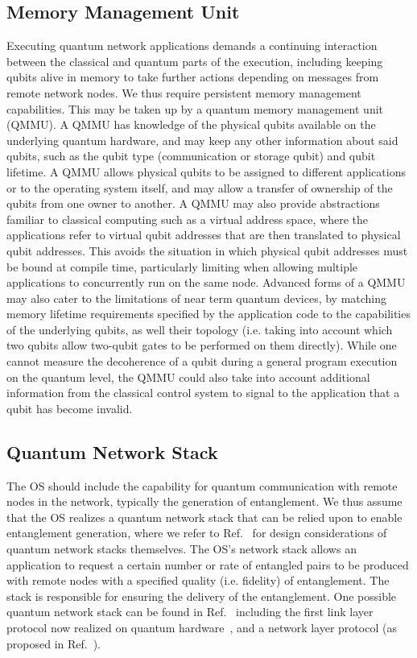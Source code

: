 \subsection{Memory Management Unit}

Executing quantum network applications demands a continuing interaction between the classical and
quantum parts of the execution, including keeping qubits alive in memory to take further actions
depending on messages from remote network nodes. We thus require persistent memory management
capabilities. This may be taken up by a quantum memory management unit (QMMU). A QMMU has knowledge
of the physical qubits available on the underlying quantum hardware, and may keep any other
information about said qubits, such as the qubit type (communication or storage qubit) and qubit
lifetime. A QMMU allows physical qubits to be assigned to different applications or to the operating
system itself, and may allow a transfer of ownership of the qubits from one owner to another. A QMMU
may also provide abstractions familiar to classical computing such as a virtual address space, where
the applications refer to virtual qubit addresses that are then translated to physical qubit
addresses. This avoids the situation in which physical qubit addresses must be bound at compile
time, particularly limiting when allowing multiple applications to concurrently run on the same
node. Advanced forms of a QMMU may also cater to the limitations of near term quantum devices, by
matching memory lifetime requirements specified by the application code to the capabilities of the
underlying qubits, as well their topology (i.e. taking into account which two qubits allow two-qubit
gates to be performed on them directly). While one cannot measure the decoherence of a qubit during
a general program execution on the quantum level, the QMMU could also take into account additional
information from the classical control system to signal to the application that a qubit has become
invalid.

\subsection{Quantum Network Stack}

The OS should include the capability for quantum communication with remote nodes in the network,
typically the generation of entanglement. We thus assume that the OS realizes a quantum network
stack that can be relied upon to enable entanglement generation, where we refer to
Ref.~\cite{dahlberg_2019_egp} for design considerations of quantum network stacks themselves. The
OS's network stack allows an application to request a certain number or rate of entangled pairs to
be produced with remote nodes with a specified quality (i.e. fidelity) of entanglement. The stack is
responsible for ensuring the delivery of the entanglement. One possible quantum network stack can be
found in Ref.~\cite{dahlberg_2019_egp} including the first link layer protocol now realized on
quantum hardware~\cite{pompili_2022_experimental}, and a network layer protocol (as proposed in
Ref.~\cite{kozlowski_2020_qnp}).

